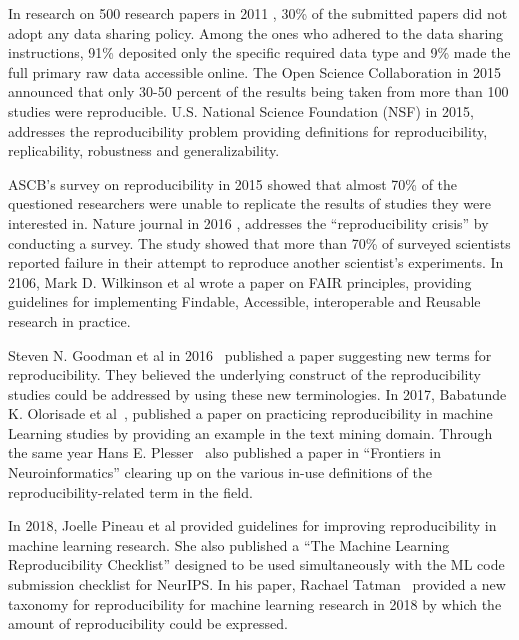 In research on 500 research papers in 2011 \cite{alsheikh-ali_public_2011},  30\% of the submitted papers did not adopt 
any data sharing policy. Among the ones who adhered to the data sharing instructions, 91\% deposited only the 
specific required data type and 9\% made the full primary raw data accessible online. The Open Science Collaboration 
in 2015 \cite{open_science_collaboration_estimating_2015} announced that only 30-50 percent of the results being taken 
from more than 100 studies were reproducible. U.S. National Science Foundation (NSF) \cite{cacioppo_social_2015} in 2015, 
addresses the reproducibility problem providing definitions for reproducibility, replicability, robustness and generalizability.  

ASCB’s survey on reproducibility in 2015 \cite{ascb_ascb_2015} showed that almost 70\% of the questioned researchers 
were unable to replicate the results of studies they were interested in. Nature journal in 2016 \cite{baker_1500_2016}, 
addresses the “reproducibility crisis” by conducting a survey. The study showed that more than 70\% of surveyed 
scientists reported failure in their attempt to reproduce another scientist's experiments.  In 2106, Mark D. Wilkinson et al 
\cite{wilkinson_fair_2016} wrote a paper on FAIR principles, providing guidelines for implementing Findable, 
Accessible, interoperable and Reusable research in practice.

Steven N. Goodman et al in 2016~\cite{goodman_what_2016} published a paper suggesting new terms for reproducibility. 
They believed the underlying construct of the reproducibility studies could be addressed by using these new terminologies. 
In 2017, Babatunde K. Olorisade et al~\cite{olorisade_reproducibility_2017}, published a paper on practicing reproducibility 
in machine Learning studies by providing an example in the text mining domain. Through the same year 
Hans E. Plesser~\cite{plesser_reproducibility_2018} also published a paper in “Frontiers in Neuroinformatics” 
clearing up on the various in-use definitions of the reproducibility-related term in the field.

In 2018, Joelle Pineau et al \cite{pineau_improving_2020} provided guidelines for improving reproducibility in 
machine learning research. She also published a “The Machine Learning Reproducibility Checklist”  designed to be used 
simultaneously with the ML code submission checklist for NeurIPS. In his paper, Rachael Tatman~\cite{tatman_practical_2018} 
provided a new taxonomy for reproducibility for machine learning research in 2018 by which the amount of reproducibility 
could be expressed. 

